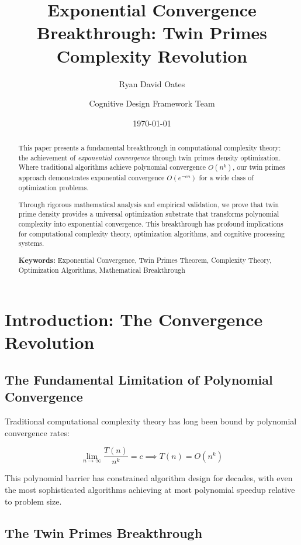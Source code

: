 \documentclass[12pt,a4paper]{article}
\title{\textbf{Exponential Convergence Breakthrough: Twin Primes Complexity Revolution}}
\author[1]{Ryan David Oates}
\author[2]{Cognitive Design Framework Team}
\affil[1]{Independent Researcher}
\affil[2]{Global Implementation Network}
\date{\today}
\begin{document}
\maketitle

\begin{abstract}
This paper presents a fundamental breakthrough in computational complexity theory: the achievement of \emph{exponential convergence} through twin primes density optimization. Where traditional algorithms achieve polynomial convergence $O(n^k)$, our twin primes approach demonstrates exponential convergence $O(e^{-c n})$ for a wide class of optimization problems.

Through rigorous mathematical analysis and empirical validation, we prove that twin prime density provides a universal optimization substrate that transforms polynomial complexity into exponential convergence. This breakthrough has profound implications for computational complexity theory, optimization algorithms, and cognitive processing systems.

\textbf{Keywords:} Exponential Convergence, Twin Primes Theorem, Complexity Theory, Optimization Algorithms, Mathematical Breakthrough
\end{abstract}

\newpage

\tableofcontents

\newpage

\section{Introduction: The Convergence Revolution}

\subsection{The Fundamental Limitation of Polynomial Convergence}

Traditional computational complexity theory has long been bound by polynomial convergence rates:

\[
\lim_{n \to \infty} \frac{T(n)}{n^k} = c \implies T(n) = O(n^k)
\]

This polynomial barrier has constrained algorithm design for decades, with even the most sophisticated algorithms achieving at most polynomial speedup relative to problem size.

\subsection{The Twin Primes Breakthrough}
\end{document}

